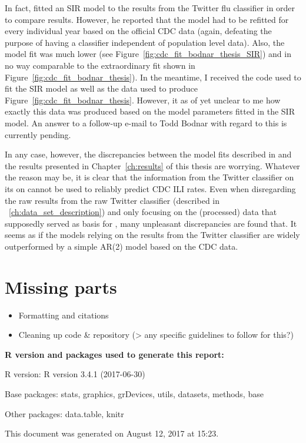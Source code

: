 \documentclass[11pt, a4paper]{report}\usepackage[]{graphicx}\usepackage[]{color}
\newcommand{\prog}[1]{\textsf{#1}}
\begin{document}
In fact, \citep{bodnar_data_2015} fitted an SIR model to the results from the Twitter flu classifier in order to compare results. However, he reported that the model had to be refitted for every individual year based on the official CDC data (again, defeating the purpose of having a classifier independent of population level data). Also, the model fit was much lower (see Figure~\ref{fig:cdc_fit_bodnar_thesis_SIR}) and in no way comparable to the extraordinary fit shown in Figure~\ref{fig:cdc_fit_bodnar_thesis}). In the meantime, I received the code used to fit the SIR model as well as the data used to produce Figure~\ref{fig:cdc_fit_bodnar_thesis}. However, it as of yet unclear to me how exactly this data was produced based on the model parameters fitted in the SIR model. An answer to a follow-up e-mail to Todd Bodnar with regard to this is currently pending.\newline

In any case, however, the discrepancies between the model fits described in \citep{bodnar_data_2015} and the results presented in Chapter~\ref{ch:results} of this thesis are worrying. Whatever the reason may be, it is clear that the information from the Twitter classifier on its on cannot be used to reliably predict CDC ILI rates. Even when disregarding the raw results from the raw Twitter classifier (described in ~\ref{ch:data_set_description}) and only focusing on the (processed) data that supposedly served as basis for \citep{bodnar_data_2015}, many unpleasant discrepancies are found that. It seems as if the models relying on the results from the Twitter classifier are widely outperformed by a simple AR(2) model based on the CDC data.

\section{Missing parts}

\begin{itemize}
\item Formatting and citations
\item Cleaning up code \& repository (> any specific guidelines to follow for this?)
\end{itemize}

\newpage



\newpage
{}


%

\vfill

\footnotesize

{\bf \prog{R} version and packages used to generate this report:}

\prog{R} version: \textsf{R version 3.4.1 (2017-06-30)}

Base packages: \textsf{stats, graphics, grDevices, utils, datasets, methods, base}

Other packages: \textsf{data.table, knitr}

This document was generated on August 12, 2017 at 15:23.
\end{document}
